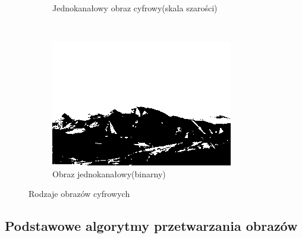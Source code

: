 \begin{figure}
\begin{subfigure}[b]{0.45\textwidth}
    \caption{Jednokanałowy obraz cyfrowy(skala szarości)}
    \label{fig:basics_image_gray}
  \end{subfigure}
  ~
  \begin{subfigure}[b]{0.45\textwidth}
    \includegraphics[width=\textwidth]{img/basics-image-binary}
    \caption{Obraz jednokanałowy(binarny)}
    \label{fig:basics_image_binary}
  \end{subfigure}
  \caption{Rodzaje obrazów cyfrowych}\label{fig:image_examples}
\end{figure}
\subsection{Podstawowe algorytmy przetwarzania obrazów}
